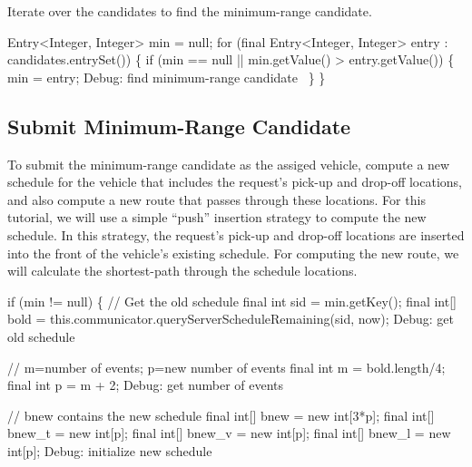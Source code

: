 Iterate over the candidates to find the minimum-range candidate.

\nwenddocs{}\endmoddef\nwstartdeflinemarkup{}\nwenddeflinemarkup
Entry<Integer, Integer> min = null;
for (final Entry<Integer, Integer> entry : candidates.entrySet()) \{
  if (min == null || min.getValue() > entry.getValue()) \{
    min = entry;
    \LA{}Debug: find minimum-range candidate~{\nwtagstyle{}}\RA{}
  \}
\}
\nwendcode{}\nwdocspar

\subsection{Submit Minimum-Range Candidate}

To submit the minimum-range candidate as the assiged vehicle, compute a new
schedule for the vehicle that includes the request's pick-up and drop-off
locations, and also compute a new route that passes through these locations.
For this tutorial, we will use a simple ``push'' insertion strategy to compute
the new schedule. In this strategy, the request's pick-up and drop-off
locations are inserted into the front of the vehicle's existing schedule. For
computing the new route, we will calculate the shortest-path through the
schedule locations.

\nwenddocs{}\endmoddef\nwstartdeflinemarkup{}\nwenddeflinemarkup
if (min != null) \{
  // Get the old schedule
  final int sid = min.getKey();
  final int[] bold = this.communicator.queryServerScheduleRemaining(sid, now);
  \LA{}Debug: get old schedule~{\nwtagstyle{}}\RA{}

  // m=number of events; p=new number of events
  final int m = bold.length/4;
  final int p = m + 2;
  \LA{}Debug: get number of events~{\nwtagstyle{}}\RA{}

  // bnew contains the new schedule
  final int[] bnew = new int[3*p];
  final int[] bnew_t = new int[p];
  final int[] bnew_v = new int[p];
  final int[] bnew_l = new int[p];
  \LA{}Debug: initialize new schedule~{\nwtagstyle{}}\RA{}

